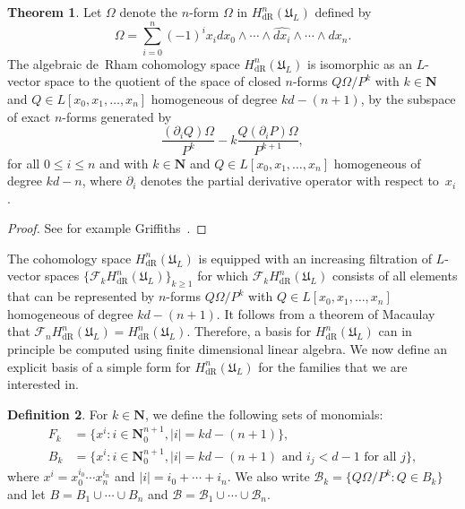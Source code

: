 \documentclass[a4paper,11pt]{article}
\numberwithin{equation}{section}
\providecommand{\abs}[1]{\lvert#1\rvert}                 %
\newcommand{\NN}{\mathbf{N}} %
\providecommand{\HdR}{H_{\text{dR}}}    %
\providecommand{\cB}{\mathcal{B}} %
\theoremstyle{definition}
\newtheorem{thm}{Theorem}[section]
\newtheorem{defn}[thm]{Definition}
\begin{document}
\begin{thm}
Let $\Omega$ denote the $n$-form $\Omega$ in $\HdR^{n}(\mathfrak{U}_L)$ 
defined by 
\begin{equation}
\Omega = \sum_{i=0}^n (-1)^i x_i d x_0 \wedge \dotsb \wedge \widehat{d x_i} \wedge \dotsb \wedge d x_n.
\end{equation}
The algebraic de~Rham cohomology space $\HdR^{n}(\mathfrak{U}_L)$ is 
isomorphic as an $L$-vector space to the quotient of the space of closed $n$-forms 
$Q \Omega / P^k$ with $k \in \NN$ and $Q \in L[x_0, x_1, \dotsc, x_n]$ 
homogeneous of degree $k d - (n + 1)$, by the subspace of exact $n$-forms generated by
\begin{equation} \label{eq:deRhamRel}
\frac{(\partial_i Q) \Omega}{P^k} - k \frac{Q (\partial_i P) \Omega}{P^{k+1}},
\end{equation}
for all $0 \leq i \leq n$ and with $k \in \NN$ and $Q \in L[x_0, x_1, \dotsc, x_n]$ 
homogeneous of degree $kd-n$, where $\partial_i$ denotes the partial derivative operator 
with respect to~$x_i$.
\end{thm}

\begin{proof}
See for example Griffiths~\citep[\S 4]{Griffiths1969}.
\end{proof}

The cohomology space $\HdR^{n}(\mathfrak{U}_L)$ is equipped with 
an increasing filtration of $L$-vector spaces 
$\{\mathcal{F}_k \HdR^{n}(\mathfrak{U}_L) \}_{k \geq 1}$ 
for which $\mathcal{F}_k \HdR^{n}(\mathfrak{U}_L)$ consists of 
all elements that can be represented by $n$-forms $Q \Omega / P^k$ 
with $Q \in L[x_0, x_1, \dotsc, x_n]$ homogeneous of degree $kd - (n + 1)$. 
It follows from a theorem of Macaulay~\citep[\S 4, (4.11)]{Griffiths1969} 
that $\mathcal{F}_n \HdR^{n}(\mathfrak{U}_L)= \HdR^{n}(\mathfrak{U}_L)$. 
Therefore, a basis for $\HdR^{n}(\mathfrak{U}_L)$ can in principle be 
computed using finite dimensional linear algebra. We now define an explicit 
basis of a simple form for $\HdR^{n}(\mathfrak{U}_L)$ for the families 
that we are interested in.


\begin{defn} \label{defn:MonBasis}
For $k \in \NN$, we define the following sets of monomials: 
\begin{align*}
F_k & = \{ x^i : i \in \mathbf{N}_{0}^{n+1}, \abs{i} = k d - (n+1) \}, \\
B_k & = \{ x^i : i \in \mathbf{N}_{0}^{n+1}, \abs{i} = k d - (n+1) \text{ and $i_j < d-1$ for all $j$}\},
\end{align*}
where $x^i = x_0^{i_0} \dotsm x_n^{i_n}$ and $\abs{i} = i_0 + \dotsb + i_n$. 
We also write $\cB_k = \{Q \Omega / P^k : Q \in B_k\}$ and let 
$B = B_1 \cup \dotsb \cup B_n$ and $\cB = \cB_1 \cup \dotsb \cup \cB_n$.
\end{defn}
\end{document}
